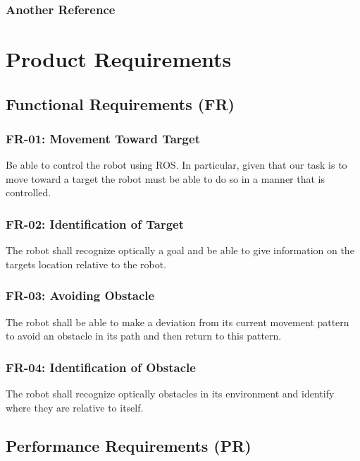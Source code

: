 \documentclass[]{report}
\begin{document}
\subsection{Another Reference}

\chapter{Product Requirements}

\section{Functional Requirements (FR)}

\subsection{FR-01: Movement Toward Target}

Be able to control the robot using ROS. In particular, given that our task is to move toward a target the robot must be able to do so in a manner that is controlled.

\subsection{FR-02: Identification of Target}

The robot shall recognize optically a goal and be able to give information on the targets location relative to the robot.

\subsection{FR-03: Avoiding Obstacle}

The robot shall be able to make a deviation from its current movement pattern to avoid an obstacle in its path and then return to this pattern.

\subsection{FR-04: Identification of Obstacle}

The robot shall recognize optically obstacles in its environment and identify where they are relative to itself.

\section{Performance Requirements (PR)}
\end{document}
